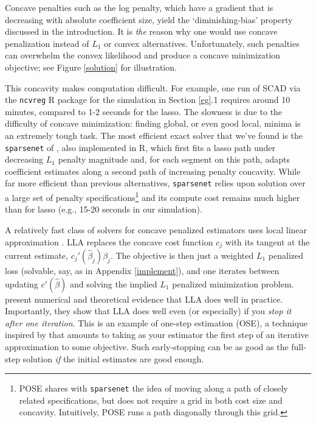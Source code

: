 \documentclass[12pt]{article}
\begin{document}
Concave penalties such as the log penalty, which have a gradient that is
decreasing with absolute coefficient size,  yield the `diminishing-bias'
property discussed in the introduction. It is {\it the} reason why one would
use concave penalization instead of $L_1$ or convex alternatives.
Unfortunately, such penalties can overwhelm the convex likelihood and produce a 
concave minimization objective; see Figure \ref{solution} for illustration.


This concavity makes computation difficult.  For example,  one run of SCAD via
the \texttt{ncvreg} R package \citep{breheny_coordinate_2011} for the
simulation in Section \ref{eg}.1 requires around 10 minutes, compared to 1-2
seconds for the lasso.  The slowness is due to the difficulty of concave
minimization: finding global, or even good local, minima is an extremely tough
task.  The most efficient exact solver that we've found is the
\texttt{sparsenet} of \citet{mazumder_sparsenet_2011}, also implemented in R,
which first fits a lasso path under decreasing $L_1$ penalty magnitude and,
for each segment on this path, adapts coefficient estimates along a second
path of increasing penalty concavity. While far more efficient than previous
alternatives, \texttt{sparsenet}  relies upon solution over a large set of
penalty specifications\footnote{POSE shares with
\texttt{sparsenet} the idea of moving along a path of closely related
specifications, but does not require a grid in both  cost size and concavity.
Intuitively,  POSE runs  a path diagonally through this grid.}  
 and its compute cost remains much higher than for lasso
(e.g., 15-20 seconds in our simulation).

A relatively fast class of solvers for concave penalized estimators uses
local linear approximation \cite[LLA; e.g.,][]{candes_enhancing_2008}. LLA
replaces the concave cost function $c_j$  with its tangent at the current
estimate, $c_j'(\hat\beta_j)\beta_j$.  The objective is then just a weighted
$L_1$ penalized loss (solvable, say, as in Appendix \ref{implement}), and one
iterates between updating $c'(\hat\beta)$ and solving the implied $L_1$
penalized minimization problem.  \citet{zou_one-step_2008} present numerical
and theoretical evidence that  LLA does well in practice. Importantly, they
show that LLA does well even (or especially) if you {\it stop it after one
iteration}. This is an example of one-step estimation (OSE), a 
technique inspired by \cite{bickel_one-step_1975} that amounts to taking as
your estimator the first step of an iterative approximation to some objective.
Such early-stopping can be as good  as the full-step solution
{\it if} the initial estimates are good enough. 
\end{document}
